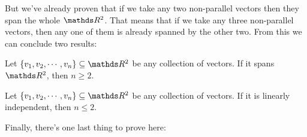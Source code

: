 But we've already proven that if we take any two non-parallel vectors then they span the whole $\R^2$. That means that if we take any three non-parallel vectors, then any one of them is already spanned by the other two. From this we can conclude two results:

\begin{prop}
	Let $\{v_1,v_2,\cdots,v_n\}\subseteq\R^2$ be any collection of vectors. If it spans $\R^2$, then $n\geq 2$.
\end{prop}
\begin{prop}
	Let $\{v_1,v_2,\cdots,v_n\}\subseteq\R^2$ be any collection of vectors. If it is linearly independent, then $n\leq 2$.
\end{prop}

Finally, there's one last thing to prove here:

